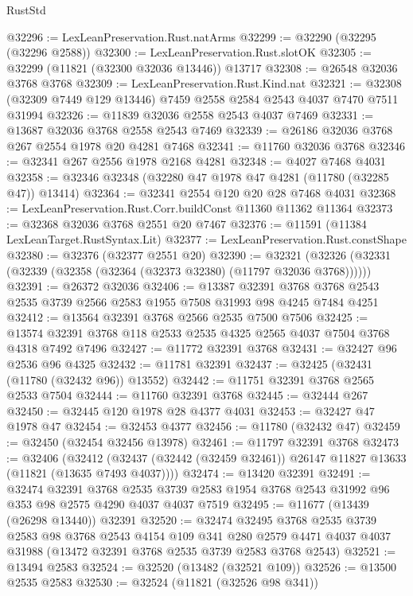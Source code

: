 \begin{lexlean}{RustStd}
\begin{coremodule}
@32296 := LexLeanPreservation.Rust.natArms
@32299 := @32290 (@32295 (@32296 @2588))
@32300 := LexLeanPreservation.Rust.slotOK
@32305 := @32299 (@11821 (@32300 @32036 @13446)) @13717
@32308 := @26548 @32036 @3768 @3768
@32309 := LexLeanPreservation.Rust.Kind.nat
@32321 := @32308 (@32309 @7449 @129 @13446) @7459 @2558 @2584 @2543 @4037 @7470 @7511 @31994
@32326 := @11839 @32036 @2558 @2543 @4037 @7469
@32331 := @13687 @32036 @3768 @2558 @2543 @7469
@32339 := @26186 @32036 @3768 @267 @2554 @1978 @20 @4281 @7468
@32341 := @11760 @32036 @3768
@32346 := @32341 @267 @2556 @1978 @2168 @4281
@32348 := @4027 @7468 @4031
@32358 := @32346 @32348 (@32280 @47 @1978 @47 @4281 (@11780 (@32285 @47)) @13414)
@32364 := @32341 @2554 @120 @20 @28 @7468 @4031
@32368 := LexLeanPreservation.Rust.Corr.buildConst @11360 @11362 @11364
@32373 := @32368 @32036 @3768 @2551 @20 @7467
@32376 := @11591 (@11384 LexLeanTarget.RustSyntax.Lit)
@32377 := LexLeanPreservation.Rust.constShape
@32380 := @32376 (@32377 @2551 @20)
@32390 := @32321 (@32326 (@32331 (@32339 (@32358 (@32364 (@32373 @32380) (@11797 @32036 @3768))))))
@32391 := @26372 @32036
@32406 := @13387
    @32391
    @3768
    @3768
    @2543
    @2535
    @3739
    @2566
    @2583
    @1955
    @7508
    @31993
    @98
    @4245
    @7484
    @4251
@32412 := @13564 @32391 @3768 @2566 @2535 @7500 @7506
@32425 := @13574 @32391 @3768 @118 @2533 @2535 @4325 @2565 @4037 @7504 @3768 @4318 @7492 @7496
@32427 := @11772 @32391 @3768
@32431 := @32427 @96 @2536 @96 @4325
@32432 := @11781 @32391
@32437 := @32425 (@32431 (@11780 (@32432 @96)) @13552)
@32442 := @11751 @32391 @3768 @2565 @2533 @7504
@32444 := @11760 @32391 @3768
@32445 := @32444 @267
@32450 := @32445 @120 @1978 @28 @4377 @4031
@32453 := @32427 @47 @1978 @47
@32454 := @32453 @4377
@32456 := @11780 (@32432 @47)
@32459 := @32450 (@32454 @32456 @13978)
@32461 := @11797 @32391 @3768
@32473 := @32406
    (@32412 (@32437 (@32442 (@32459 @32461)) @26147 @11827 @13633 (@11821 (@13635 @7493 @4037))))
@32474 := @13420 @32391
@32491 := @32474
    @32391
    @3768
    @2535
    @3739
    @2583
    @1954
    @3768
    @2543
    @31992
    @96
    @353
    @98
    @2575
    @4290
    @4037
    @4037
    @7519
@32495 := @11677 (@13439 (@26298 @13440)) @32391
@32520 := @32474
    @32495
    @3768
    @2535
    @3739
    @2583
    @98
    @3768
    @2543
    @4154
    @109
    @341
    @280
    @2579
    @4471
    @4037
    @4037
    @31988
    (@13472 @32391 @3768 @2535 @3739 @2583 @3768 @2543)
@32521 := @13494 @2583
@32524 := @32520 (@13482 (@32521 @109))
@32526 := @13500 @2535 @2583
@32530 := @32524 (@11821 (@32526 @98 @341))

\end{coremodule}
\end{lexlean}
